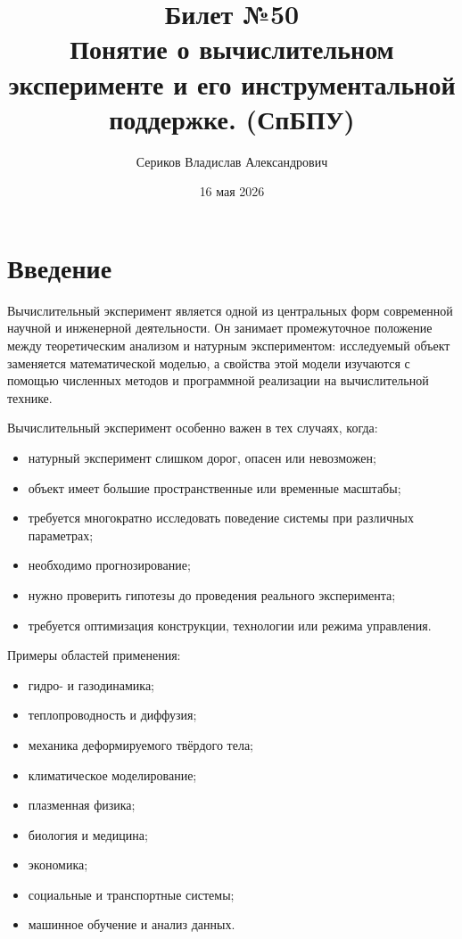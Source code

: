 \documentclass[12pt,a4paper]{article}
\title{Билет №50 \\ \small Понятие о вычислительном эксперименте и его инструментальной поддержке. (СпБПУ)}
\author{Сериков Владислав Александрович}
\date{16 мая 2026}
\theoremstyle{definition}
\theoremstyle{plain}
\begin{document}
\maketitle
\tableofcontents
\newpage

\section{Введение}

Вычислительный эксперимент является одной из центральных форм современной научной и инженерной деятельности. Он занимает промежуточное положение между теоретическим анализом и натурным экспериментом: исследуемый объект заменяется математической моделью, а свойства этой модели изучаются с помощью численных методов и программной реализации на вычислительной технике.

Вычислительный эксперимент особенно важен в тех случаях, когда:
\begin{itemize}
    \item натурный эксперимент слишком дорог, опасен или невозможен;
    \item объект имеет большие пространственные или временные масштабы;
    \item требуется многократно исследовать поведение системы при различных параметрах;
    \item необходимо прогнозирование;
    \item нужно проверить гипотезы до проведения реального эксперимента;
    \item требуется оптимизация конструкции, технологии или режима управления.
\end{itemize}

Примеры областей применения:
\begin{itemize}
    \item гидро- и газодинамика;
    \item теплопроводность и диффузия;
    \item механика деформируемого твёрдого тела;
    \item климатическое моделирование;
    \item плазменная физика;
    \item биология и медицина;
    \item экономика;
    \item социальные и транспортные системы;
    \item машинное обучение и анализ данных.
\end{itemize}
\end{document}
